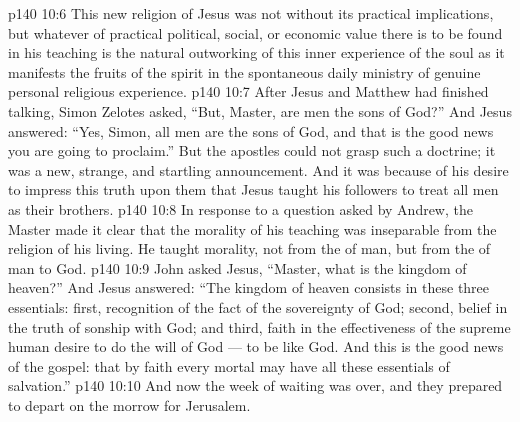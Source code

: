 \vs p140 10:6 This new religion of Jesus was not without its practical implications, but whatever of practical political, social, or economic value there is to be found in his teaching is the natural outworking of this inner experience of the soul as it manifests the fruits of the spirit in the spontaneous daily ministry of genuine personal religious experience.
\vs p140 10:7 After Jesus and Matthew had finished talking, Simon Zelotes asked, “But, Master, are  men the sons of God?” And Jesus answered: \textcolor{ubdarkred}{“Yes, Simon, all men are the sons of God, and that is the good news you are going to proclaim.”} But the apostles could not grasp such a doctrine; it was a new, strange, and startling announcement. And it was because of his desire to impress this truth upon them that Jesus taught his followers to treat all men as their brothers.
\vs p140 10:8 In response to a question asked by Andrew, the Master made it clear that the morality of his teaching was inseparable from the religion of his living. He taught morality, not from the  of man, but from the  of man to God.
\vs p140 10:9 \pc John asked Jesus, “Master, what is the kingdom of heaven?” And Jesus answered: \textcolor{ubdarkred}{“The kingdom of heaven consists in these three essentials: first, recognition of the fact of the sovereignty of God; second, belief in the truth of sonship with God; and third, faith in the effectiveness of the supreme human desire to do the will of God --- to be like God. And this is the good news of the gospel: that by faith every mortal may have all these essentials of salvation.”}
\vs p140 10:10 \pc And now the week of waiting was over, and they prepared to depart on the morrow for Jerusalem.
